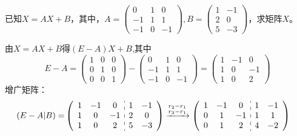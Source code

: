\documentclass[a4paper]{report}
\begin{document}
\EX 已知$X=AX+B$，其中，$A=
\begin{pmatrix}
0&1&0\\
-1&1&1\\
-1&0&-1
\end{pmatrix},B=
\begin{pmatrix}
1&-1\\
2&0\\
5&-3
\end{pmatrix}
$，求矩阵$X$。

\begin{jie}
由$X=AX+B$得$(E-A)X+B$,其中
\begin{equation*}
E-A=\begin{pmatrix}
1&0&0\\
0&1&0\\
0&0&1
\end{pmatrix}-\begin{pmatrix}
0&1&0\\
-1&1&1\\
-1&0&-1
\end{pmatrix}=
\begin{pmatrix}
1&-1&0\\
1&0&-1\\
1&0&2
\end{pmatrix}
\end{equation*}
增广矩阵：
\begin{align*}
(E-A|B)=&
\left(
 \begin{array}{c:c}
\begin{matrix}
1&-1&0\\
1&0&-1\\
1&0&2
\end{matrix}&
\begin{matrix}
1&-1\\
2&0\\
5&-3
\end{matrix}
\end{array}
\right)\xrightarrow{\substack{r_{2}- r_{1}\\ r_3-r_1}}
{
\left(
 \begin{array}{c:c}
\begin{matrix}
1&-1&0\\
0&1&-1\\
0&1&2
\end{matrix}&
\begin{matrix}
1&-1\\
1&1\\
4&-2
\end{matrix}
\end{array}
\right)
}
\end{align*}
\end{jie}
\end{document}
